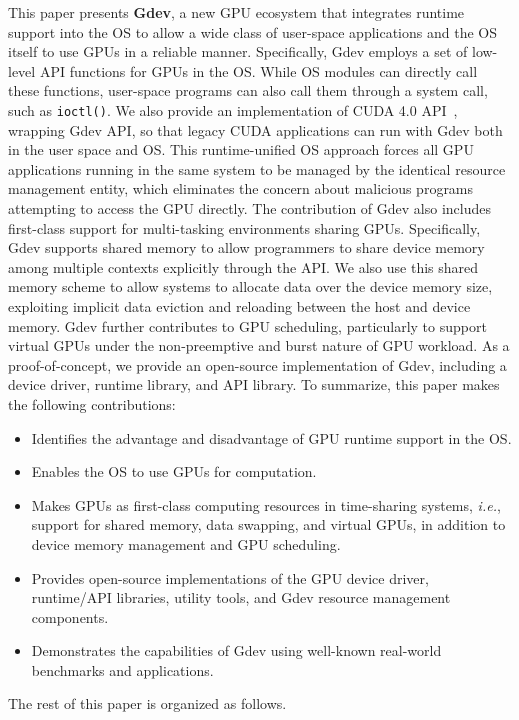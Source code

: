 This paper presents \textbf{Gdev}, a new GPU ecosystem that integrates
runtime support into the OS to allow a wide class of user-space
applications and the OS itself to use GPUs in a reliable manner.
Specifically, Gdev employs a set of low-level API functions for GPUs
in the OS.
While OS modules can directly call these functions, user-space
programs can also call them through a system call, such as
\texttt{ioctl()}.
We also provide an implementation of CUDA 4.0 API~\cite{CUDA40},
wrapping Gdev API, so that legacy CUDA applications can run with Gdev
both in the user space and OS. 
This runtime-unified OS approach forces all GPU applications running in
the same system to be managed by the identical resource management
entity, which eliminates the concern about malicious programs attempting
to access the GPU directly.
The contribution of Gdev also includes first-class support for
multi-tasking environments sharing GPUs.
Specifically, Gdev supports shared memory to allow programmers to
share device memory among multiple contexts explicitly through the API.
We also use this shared memory scheme to allow systems to allocate data
over the device memory size, exploiting implicit data eviction and
reloading between the host and device memory.
Gdev further contributes to GPU scheduling, particularly
to support virtual GPUs under the non-preemptive and burst nature of GPU
workload.
As a proof-of-concept, we provide an open-source implementation of Gdev,
including a device driver, runtime library, and API library.
To summarize, this paper makes the following contributions:
\begin{itemize}
 \vspace{-0.5em}
 \item Identifies the advantage and disadvantage of GPU runtime support
       in the OS.
 \vspace{-0.5em}
 \item Enables the OS to use GPUs for computation.
 \vspace{-0.5em}
 \item Makes GPUs as first-class computing resources in time-sharing
       systems, \textit{i.e.}, support for shared memory, data swapping,
       and virtual GPUs, in addition to device memory management and GPU
       scheduling.
 \vspace{-0.5em}
 \item Provides open-source implementations of the GPU device driver,
       runtime/API libraries, utility tools, and Gdev resource
       management components.
 \vspace{-0.5em}
 \item Demonstrates the capabilities of Gdev using well-known real-world
       benchmarks and applications.
 \vspace{-0.5em}
\end{itemize}

The rest of this paper is organized as follows.